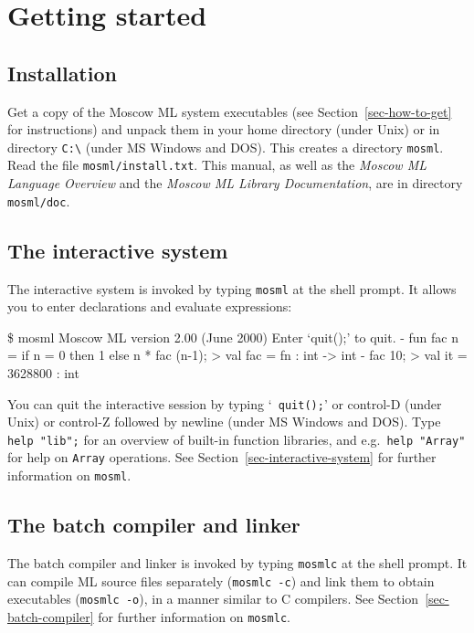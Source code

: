 \documentclass[fleqn]{article}
\begin{document}
\tableofcontents

\newpage

\section{Getting started}
\label{sec-getting-started}

\subsection{Installation}

Get a copy of the Moscow ML system executables (see
Section~\ref{sec-how-to-get} for instructions) and unpack them in your
home directory (under Unix) or in directory \verb#C:\# (under MS
Windows and DOS)\@.  This creates a directory {\tt mosml}.  Read the
file {\tt mosml/install.txt}.  This manual, as well as the {\em Moscow
  ML Language Overview\/} and the \emph{Moscow ML Library
  Documentation}, are in directory {\tt mosml/doc}.


\subsection{The interactive system}

The interactive system is invoked by typing {\tt mosml} at the shell
prompt.  It allows you to enter declarations and evaluate expressions:

\begin{program}
\$ mosml
Moscow ML version 2.00 (June 2000)
Enter `quit();' to quit.
-  fun fac n = if n = 0 then 1 else n * fac (n-1);
> val fac = fn : int -> int
-  fac 10;
> val it = 3628800 : int
\end{program}

\noindent You can quit the interactive session by typing `{\tt
  quit();}' or control-D (under Unix) or control-Z followed by newline
(under MS Windows and DOS)\@.  Type {\tt help "lib";} for an overview
of built-in function libraries, and e.g.\ {\tt help "Array"} for help
on {\tt Array} operations.  See Section~\ref{sec-interactive-system}
for further information on {\tt mosml}.


\subsection{The batch compiler and linker}

The batch compiler and linker is invoked by typing {\tt mosmlc} at the
shell prompt.  It can compile ML source files separately ({\tt mosmlc
  -c}) and link them to obtain executables ({\tt mosmlc -o}), in a
manner similar to C compilers.  See Section~\ref{sec-batch-compiler}
for further information on {\tt mosmlc}.
\end{document}
